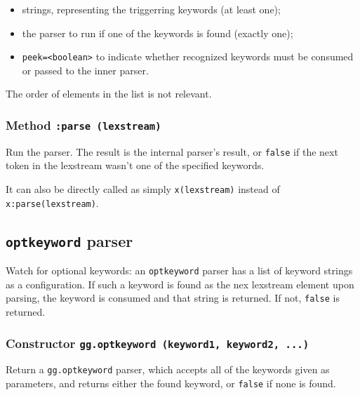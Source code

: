 \begin{itemize}
\item strings, representing the triggerring keywords (at least one);
\item the parser to run if one of the keywords is found (exactly one);
\item \verb|peek=<boolean>| to indicate whether recognized keywords
  must be consumed or passed to the inner parser.
\end{itemize}
The order of elements in the list is not relevant.

\subsubsection{Method {\tt :parse (lexstream)}}

Run the parser. The result is the internal parser's result, or
\verb|false| if the next token in the lexstream wasn't one of the
specified keywords.

It can also be directly called as simply \verb|x(lexstream)| instead of
\verb|x:parse(lexstream)|.

\subsection{{\tt optkeyword} parser}

Watch for optional keywords: an \verb|optkeyword| parser has a list of
keyword strings as a configuration. If such a keyword is found as the
nex lexstream element upon parsing, the keyword is consumed and that
string is returned. If not, \verb|false| is returned.

\subsubsection{Constructor {\tt gg.optkeyword (keyword1, keyword2, ...)}}

Return a \verb|gg.optkeyword| parser, which accepts all of the
keywords given as parameters, and returns either the found keyword, or
\verb|false| if none is found.

